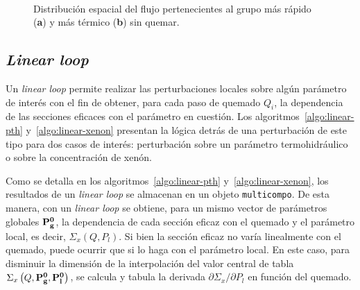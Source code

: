 \documentclass[11pt]{article}
\renewcommand{\vec}[1]{\ensuremath\mathbf{#1}}
\begin{document}
\begin{figure}[!h]
 \begin{center}
  \\
  \caption{Distribución espacial del flujo pertenecientes al grupo más rápido (\textbf{a}) y más térmico (\textbf{b}) sin quemar.}
  \label{fig:fluxes}
 \end{center}
\end{figure}


\subsection{\emph{Linear loop}} \label{subsec:linear-loop}

Un \emph{linear loop} permite realizar las perturbaciones locales sobre algún parámetro de interés con el fin de obtener, para cada paso de quemado $Q_i$, la dependencia de las secciones eficaces con el parámetro en cuestión. Los algoritmos~\ref{algo:linear-pth} y~\ref{algo:linear-xenon} presentan la lógica detrás de una perturbación de este tipo para dos casos de interés: perturbación sobre un parámetro termohidráulico o sobre la concentración de xenón.

Como se detalla en los algoritmos~\ref{algo:linear-pth} y~\ref{algo:linear-xenon}, los resultados de un \emph{linear loop} se almacenan en un objeto \texttt{multicompo}. De esta manera, con un \emph{linear loop} se obtiene, para un mismo vector de parámetros globales $\vec{P^0_g}$, la dependencia de cada sección eficaz con el quemado y el parámetro local, es decir, $\Sigma_x \left( Q, P_l \right)$. Si bien la sección eficaz no varía linealmente con el quemado, puede ocurrir que si lo haga con el parámetro local. En este caso, para disminuir la dimensión de la interpolación del valor central de tabla $\Sigma_x \left( Q, \vec{P^0_g}, \vec{P^0_l} \right)$, se calcula y tabula la derivada $\partial\Sigma_x / \partial P_l$ en función del quemado.
\end{document}
